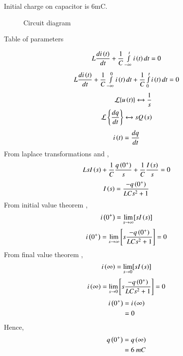\documentclass[beamer]{IEEEtran}
\theoremstyle{remark}
\begin{document}
     Initial charge on capacitor is 6mC.
     \begin{figure}[h]


  
    

    



  
  
       
  
    \caption{Circuit diagram}
     
   \label{fig:12.7.8.1}
\end{figure}
\begin{table}[h]
  \centering
  
  \caption{Table of parameters}
  \label{tab:12.7.8.1}
\end{table}
\begin{align}
    L\frac{di\left(t\right)}{dt}+\frac{1}{C}\smallint_{-\infty}^{t}i\left(t\right)dt=0
\end{align}
\begin{align}
      L\frac{di\left(t\right)}{dt}+\frac{1}{C}\smallint_{-\infty}^{0}i\left(t\right)dt+\frac{1}{C}\smallint_{0}^{t}i\left(t\right)dt=0
\end{align}
\begin{gather}
\begin{align}
\mathcal{L}\{u\left(t\right)\} \xleftrightarrow{} \frac{1}{s}\\
\mathcal{L} \left\{\frac{dq}{dt}\right\}\xleftrightarrow{} sQ\left(s\right)
\end{align}
\end{gather}
\begin{align}
 i\left(t\right)=\frac{dq}{dt}
\end{align}
From laplace transformations  and ,
\begin{align}
    L{sI\left(s\right)}+\frac{1}{C}\frac{q\left(0^{+}\right)}{s}+\frac{1}{C}\frac{I\left(s\right)}{s}=0
\end{align}
\begin{align}
    I\left(s\right)= \frac{-q\left(0^{+}\right)}{LCs^2+1}
\end{align}
From initial value theorem ,
\begin{align}
    i\left(0^{+}\right)=\lim_{s\to\infty}[sI\left(s\right)]
\end{align}
\begin{align}
    i\left(0^{+}\right)=\lim_{s\to\infty}\left[s\frac{-q\left(0^{+}\right)}{LCs^2+1}\right]=0
\end{align}
From final value theorem ,
\begin{align}
     i\left(\infty\right)=\lim_{s\to0}[sI\left(s\right)]
\end{align}
\begin{align}
   i\left(\infty\right)=\lim_{s\to0}\left[s\frac{-q\left(0^{+}\right)}{LCs^2+1}\right]=0 
\end{align}
\begin{align}
	\label{1}
	i\left(0^{+}\right)&=i\left(\infty\right)\\
	&=0
\end{align}
Hence,
\begin{align}
	q\left(0^{+}\right)&=q\left(\infty\right)\\
	&=6\ mC
\end{align}
\end{document}
